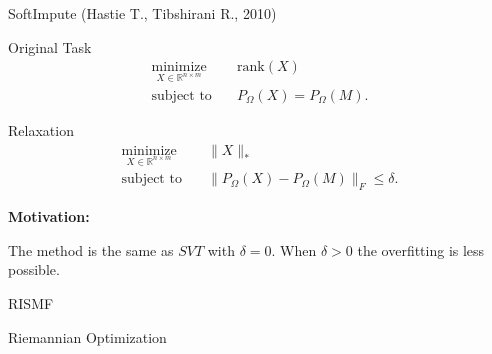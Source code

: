 \documentclass{beamer}
\begin{document}
\begin{frame}{SoftImpute (Hastie T., Tibshirani R., 2010)}
	\begin{block}{Original Task}
		\begin{align*}
		\mathop{\text{minimize}}\limits_{X \in \mathbb{R}^{n \times m}} \quad & 
		\text{rank} (X) \\
		\text{subject to} \quad & P_{\Omega} (X) = P_{\Omega} (M).
		\end{align*}
	\end{block}
	\begin{block}{Relaxation}
		\begin{align*}
		\mathop{\text{minimize}}\limits_{X \in \mathbb{R}^{n \times m}} \quad & 
		\| X \|_* \\
		\text{subject to} \quad & \| P_{\Omega} (X) - P_{\Omega} (M) \|_F \leq \delta.
		\end{align*}
	\end{block}
	\textbf{Motivation:}
	
		The method is the same as $SVT$ with $\delta = 0$. When $\delta>0$ the overfitting is less possible. 
\end{frame}
\begin{frame}{RISMF}
\end{frame}
\begin{frame}{Riemannian Optimization}
\end{frame}
\end{document}
